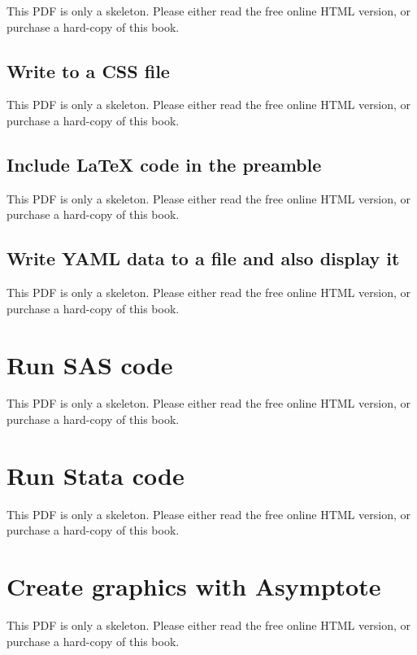 \documentclass[
  11pt,
]{krantz}
\begin{document}
This PDF is only a skeleton. Please either read the free online HTML version, or purchase a hard-copy of this book.

\subsection{Write to a CSS file}\label{write-to-a-css-file}

This PDF is only a skeleton. Please either read the free online HTML version, or purchase a hard-copy of this book.

\subsection{Include LaTeX code in the preamble}\label{include-latex-code-in-the-preamble}

This PDF is only a skeleton. Please either read the free online HTML version, or purchase a hard-copy of this book.

\subsection{Write YAML data to a file and also display it}\label{write-yaml-data-to-a-file-and-also-display-it}

This PDF is only a skeleton. Please either read the free online HTML version, or purchase a hard-copy of this book.

\section{Run SAS code}\label{eng-sas}

This PDF is only a skeleton. Please either read the free online HTML version, or purchase a hard-copy of this book.

\section{Run Stata code}\label{eng-stata}

This PDF is only a skeleton. Please either read the free online HTML version, or purchase a hard-copy of this book.

\section{Create graphics with Asymptote}\label{eng-asy}

This PDF is only a skeleton. Please either read the free online HTML version, or purchase a hard-copy of this book.
\end{document}
